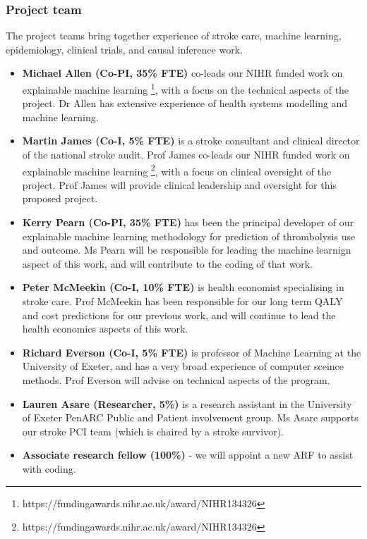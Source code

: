 \subsubsection{Project team}

The project teams bring together experience of stroke care, machine learning, epidemiology, clinical trials, and causal inference work.

\begin{itemize}

    \item \textbf{Michael Allen (Co-PI, 35\% FTE)} co-leads our NIHR funded work on explainable machine learning \footnote{https://fundingawards.nihr.ac.uk/award/NIHR134326}, with a focus on the technical aspects of the project. Dr Allen has extensive experience of health systems modelling and machine learning.

    \item \textbf{Martin James (Co-I, 5\% FTE)} is a stroke consultant and clinical director of the national stroke audit. Prof James co-leads our NIHR funded work on explainable machine learning \footnote{https://fundingawards.nihr.ac.uk/award/NIHR134326}, with a focus on clinical oversight of the project. Prof James will provide clinical leadership and oversight for this proposed project.

    \item \textbf{Kerry Pearn (Co-PI, 35\% FTE)} has been the principal developer of our explainable machine learning methodology for prediction of thrombolysis use and outcome. Ms Pearn will be responsible for leading the machine learnign aspect of this work, and will contribute to the coding of that work.

    \item \textbf{Peter McMeekin (Co-I, 10\% FTE)} is health economist specialising in stroke care. Prof McMeekin has been responsible for our long term QALY and cost predictions for our previous work, and will continue to lead the health economics aspects of this work.

    \item \textbf{Richard Everson (Co-I, 5\% FTE)} is professor of Machine Learning at the University of Exeter, and has a very broad experience of computer sceince methods. Prof Everson will advise on technical aspects of the program.

    \item \textbf{Lauren Asare (Researcher, 5\%)} is a research assistant in the University of Exeter PenARC Public and Patient involvement group. Ms Asare supports our stroke PCI team (which is chaired by a stroke survivor).

    \item \textbf{{Associate research fellow (100\%)}} - we will appoint a new ARF to assist with coding.

\end{itemize}

